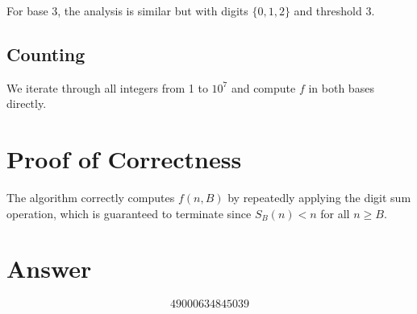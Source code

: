 \documentclass[12pt]{article}
\begin{document}
For base 3, the analysis is similar but with digits $\{0,1,2\}$ and threshold 3.

\subsection{Counting}

We iterate through all integers from 1 to $10^7$ and compute $f$ in both bases directly.

\section{Proof of Correctness}

The algorithm correctly computes $f(n,B)$ by repeatedly applying the digit sum operation, which is guaranteed to terminate since $S_B(n) < n$ for all $n \ge B$.

\section{Answer}

\[
\boxed{49000634845039}
\]
\end{document}

